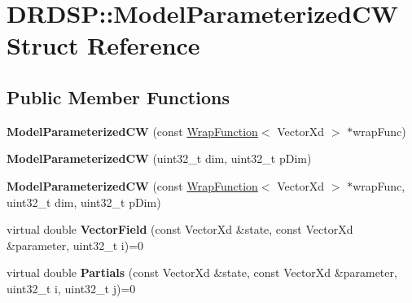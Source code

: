 \hypertarget{struct_d_r_d_s_p_1_1_model_parameterized_c_w}{\section{D\-R\-D\-S\-P\-:\-:Model\-Parameterized\-C\-W Struct Reference}
\label{struct_d_r_d_s_p_1_1_model_parameterized_c_w}
}
\subsection*{Public Member Functions}
\begin{DoxyCompactItemize}
\item 
\hypertarget{struct_d_r_d_s_p_1_1_model_parameterized_c_w_a6dc3f89073452ab9fe6e0060aa14ad24}{{\bfseries Model\-Parameterized\-C\-W} (const \hyperlink{struct_d_r_d_s_p_1_1_wrap_function}{Wrap\-Function}$<$ Vector\-Xd $>$ $\ast$wrap\-Func)}\label{struct_d_r_d_s_p_1_1_model_parameterized_c_w_a6dc3f89073452ab9fe6e0060aa14ad24}

\item 
\hypertarget{struct_d_r_d_s_p_1_1_model_parameterized_c_w_a81d7ee9a3974ed8bee6664609ee96b69}{{\bfseries Model\-Parameterized\-C\-W} (uint32\-\_\-t dim, uint32\-\_\-t p\-Dim)}\label{struct_d_r_d_s_p_1_1_model_parameterized_c_w_a81d7ee9a3974ed8bee6664609ee96b69}

\item 
\hypertarget{struct_d_r_d_s_p_1_1_model_parameterized_c_w_a9ce0b83304e3da9c41142baf2e5f8b75}{{\bfseries Model\-Parameterized\-C\-W} (const \hyperlink{struct_d_r_d_s_p_1_1_wrap_function}{Wrap\-Function}$<$ Vector\-Xd $>$ $\ast$wrap\-Func, uint32\-\_\-t dim, uint32\-\_\-t p\-Dim)}\label{struct_d_r_d_s_p_1_1_model_parameterized_c_w_a9ce0b83304e3da9c41142baf2e5f8b75}

\item 
\hypertarget{struct_d_r_d_s_p_1_1_model_parameterized_c_w_a21a471d9a6eebf3939b6605a9243253d}{virtual double {\bfseries Vector\-Field} (const Vector\-Xd \&state, const Vector\-Xd \&parameter, uint32\-\_\-t i)=0}\label{struct_d_r_d_s_p_1_1_model_parameterized_c_w_a21a471d9a6eebf3939b6605a9243253d}

\item 
\hypertarget{struct_d_r_d_s_p_1_1_model_parameterized_c_w_a6b8e4d5f583b7553db1986a6ef859c86}{virtual double {\bfseries Partials} (const Vector\-Xd \&state, const Vector\-Xd \&parameter, uint32\-\_\-t i, uint32\-\_\-t j)=0}\label{struct_d_r_d_s_p_1_1_model_parameterized_c_w_a6b8e4d5f583b7553db1986a6ef859c86}

\end{DoxyCompactItemize}
